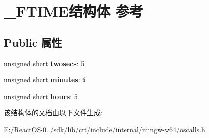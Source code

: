 \hypertarget{struct___f_t_i_m_e}{}\section{\+\_\+\+F\+T\+I\+M\+E结构体 参考}
\label{struct___f_t_i_m_e}
\subsection*{Public 属性}
\begin{DoxyCompactItemize}
\item 
\mbox{\label{struct___f_t_i_m_e_ac6cb03f5af84f34d2a6c4c934437d5f4}} 
unsigned short {\bfseries twosecs}\+: 5
\item 
\mbox{\label{struct___f_t_i_m_e_a6df8ac65d93387f08ae00170c2124418}} 
unsigned short {\bfseries minutes}\+: 6
\item 
\mbox{\label{struct___f_t_i_m_e_a4396f88443ce4959d2ee5b08910ef34f}} 
unsigned short {\bfseries hours}\+: 5
\end{DoxyCompactItemize}


该结构体的文档由以下文件生成\+:\begin{DoxyCompactItemize}
\item 
E\+:/\+React\+O\+S-\/0../sdk/lib/crt/include/internal/mingw-\/w64/oscalls.\+h\end{DoxyCompactItemize}
